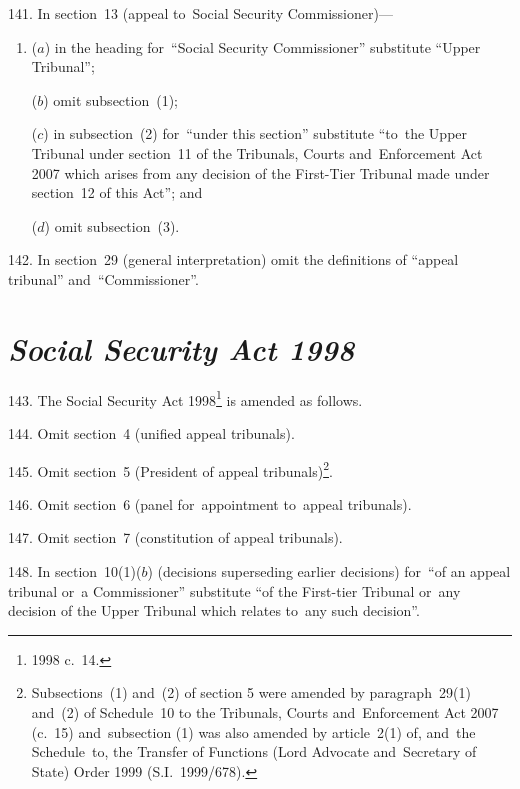 \documentclass[12pt,a4paper]{article}
\begin{document}
\medskip

141.  In section~13 (appeal to~Social Security Commissioner)—
\begin{enumerate}\item[]
($a$) in the heading for~“Social Security Commissioner” substitute “Upper Tribunal”;

($b$) omit subsection~(1);

($c$) in subsection~(2) for~“under this section” substitute “to~the Upper Tribunal under section~11 of the Tribunals, Courts and~Enforcement Act 2007 which arises from any decision of the First-Tier Tribunal made under section~12 of this Act”; and

($d$) omit subsection~(3).
\end{enumerate}

142.  In section~29 (general interpretation) omit the definitions of “appeal tribunal” and~“Commissioner”.

\section*{\itshape Social Security Act 1998}

143.  The Social Security Act 1998\footnote{1998 c.~14.} is amended as follows.

\medskip

144.  Omit section~4 (unified appeal tribunals).

\medskip

145.  Omit section~5 (President of appeal tribunals)\footnote{Subsections~(1) and~(2) of section 5 were amended by paragraph~29(1) and~(2) of Schedule~10 to the Tribunals, Courts and~Enforcement Act 2007 (c.~15) and~subsection (1) was also amended by article~2(1) of, and~the Schedule~to, the Transfer of Functions (Lord Advocate and~Secretary of State) Order 1999 (S.I.~1999/678).}.

\medskip

146.  Omit section~6 (panel for~appointment to~appeal tribunals).

\medskip

147.  Omit section~7 (constitution of appeal tribunals).

\medskip

148.  In section~10(1)($b$)  (decisions superseding earlier decisions) for~“of an appeal tribunal or~a Commissioner” substitute “of the First-tier Tribunal or~any decision of the Upper Tribunal which relates to~any such decision”.

\medskip
\end{document}
